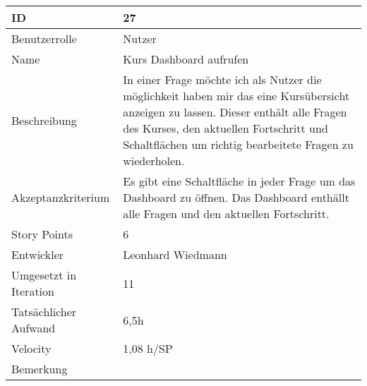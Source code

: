 \begin{tabularx}{\textwidth}{|p{}|X|}
	\hline
	ID & 27 \\
	\hline
	Benutzerrolle & Nutzer \\
	\hline
	Name & Kurs Dashboard aufrufen\\
	\hline
	Beschreibung & In einer Frage möchte ich als Nutzer die möglichkeit haben mir das eine Kursübersicht anzeigen zu lassen.
		Dieser enthält alle Fragen des Kurses, den aktuellen Fortschritt und Schaltflächen um richtig bearbeitete Fragen zu wiederholen. \\
	\hline
	Akzeptanzkriterium & Es gibt eine Schaltfläche in jeder Frage um das Dashboard zu öffnen. Das Dashboard enthällt alle Fragen und den aktuellen Fortschritt. \\
	\hline
	Story Points & 6 \\
	\hline
	Entwickler & Leonhard Wiedmann \\
	\hline
	Umgesetzt in Iteration & 11 \\
	\hline
	Tatsächlicher Aufwand & 6,5h\\
	\hline
	Velocity & 1,08 h/SP\\
	\hline
	Bemerkung & \\
	\hline
\end{tabularx}
\vspace{20pt}
